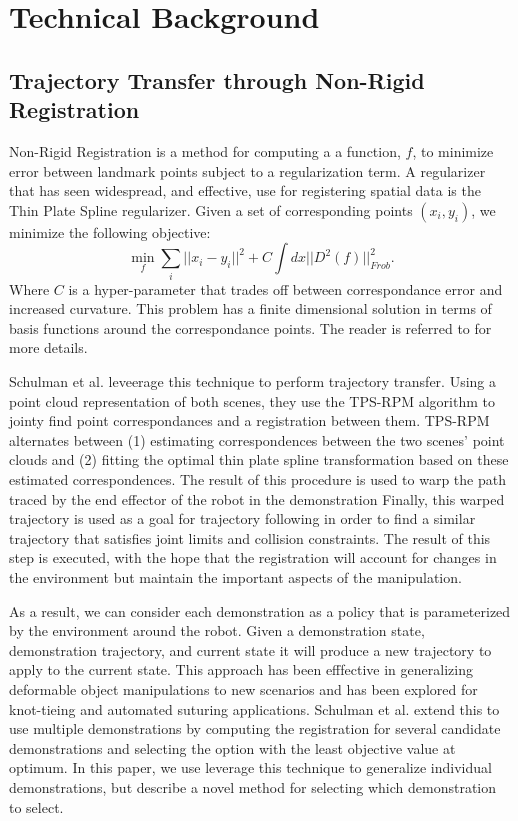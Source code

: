 \section{Technical Background}

\subsection{Trajectory Transfer through Non-Rigid Registration}
Non-Rigid Registration is a method for computing a a function, $f$, to minimize error between landmark points subject to a regularization term.
A regularizer that has seen widespread, and effective, use for registering spatial data is the Thin Plate Spline regularizer.
Given a set of corresponding points $(x_i, y_i)$, we minimize the following objective:
$$\min_f \sum_i ||x_i - y_i||^2 + C\int dx ||D^2(f)||^2_{Frob}.$$
Where $C$ is a hyper-parameter that trades off between correspondance error and increased curvature.
This problem has a finite dimensional solution in terms of basis functions around the correspondance points.
The reader is referred to  for more details.

Schulman et al. leveerage this technique to perform trajectory transfer. 
Using a point cloud representation of both scenes, they use the TPS-RPM algorithm to jointy find point correspondances and a registration between them.
TPS-RPM alternates between (1) estimating correspondences between the two scenes' point clouds and (2) fitting the optimal thin plate spline transformation based on these estimated correspondences. 
The result of this procedure is used to warp the path traced by the end effector of the robot in the demonstration
Finally, this warped trajectory is used as a goal for trajectory following in order to find a similar trajectory that satisfies joint limits and collision constraints.
The result of this step is executed, with the hope that the registration will account for changes in the environment but maintain the important aspects of the manipulation.

As a result, we can consider each demonstration as a policy that is parameterized by the environment around the robot.
Given a demonstration state, demonstration trajectory, and current state it will produce a new trajectory to apply to the current state.
This approach has been efffective in generalizing deformable object manipulations to new scenarios and has been explored for knot-tieing and automated suturing applications.
Schulman et al. extend this to use multiple demonstrations by computing the registration for several candidate demonstrations and selecting the option with the least objective value at optimum.
In this paper, we use leverage this technique to generalize individual demonstrations, but describe a novel method for selecting which demonstration to select.
